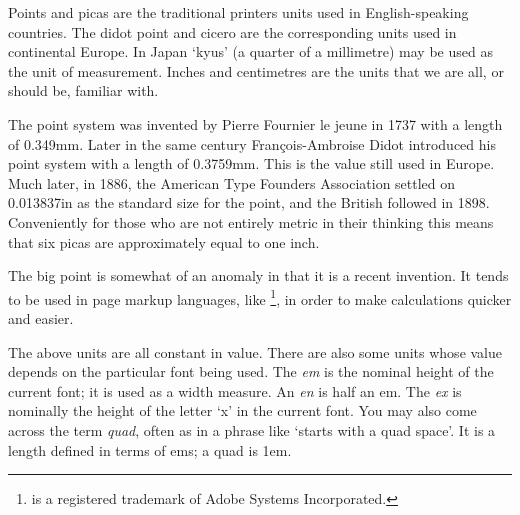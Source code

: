 \documentclass[10pt,a4paper,extrafontsizes]{memoir}
\newcommand{\PWnote}[2]{}
\begin{document}
\begin{paracol}{2}
\switchEng
    Points and picas 
are the traditional printers units used in English-speaking countries. 
The didot point and cicero are the 
corresponding units used in continental Europe. In Japan `kyus'
(a quarter of a millimetre) may be used as the unit of measurement.
Inches and centimetres are the units that we
are all, or should be, familiar with.

    The point system was invented by Pierre Fournier le jeune in 1737 with
a length of 0.349mm. Later in the same century Fran\c{c}ois-Ambroise Didot
introduced his point system with a length of 0.3759mm. This is the value
still used in Europe. Much later, in 1886, the American Type Founders
Association settled on 0.013837in as the standard size for the point, and
the British followed in 1898. Conveniently for those who are not entirely
metric in their thinking this means that 
six picas are approximately equal to one inch.

    The big point 
is somewhat of an anomaly in that it is a recent
invention. It tends to be used
in page markup languages, like \pscript\footnote{\pscript{} is a 
registered trademark of Adobe Systems Incorporated.\label{fn:ps}},
in order to make calculations quicker and easier.

    The above units are all constant in value. There are also some units
whose value depends on the particular font being used. 
The \textit{em}
is the nominal height of the current font; it is used as a width measure.
An \textit{en} is half an em.
The \textit{ex} is
nominally the height of the letter `x' in the current font. You may also
come across the term \textit{quad}, often as in a phrase
like `starts with a quad space'. It is a length defined in terms of
ems; a quad is 1em.
\end{paracol}

\cleardoublepage

\mainmatter



\PWnote{2009/02/02}{Added Historical background chapter}
\end{document}
